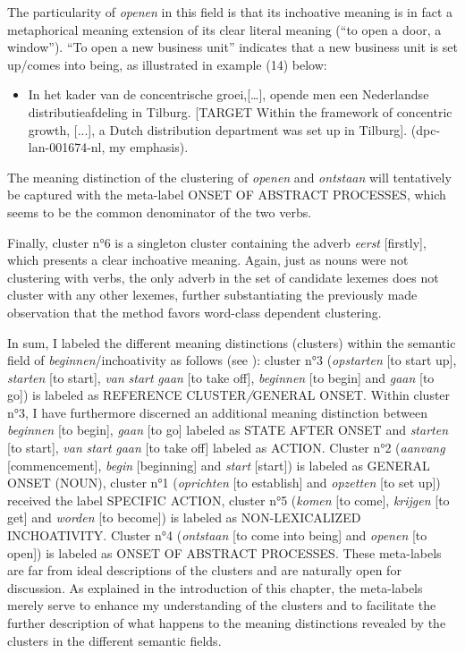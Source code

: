 The particularity of \textit{openen} in this field is that its inchoative meaning is in fact a metaphorical meaning extension of its clear literal meaning (“to open a door, a window”). “To open a new business unit” indicates that a new business unit is set up/comes into being, as illustrated in example (14) below:

\begin{itemize}
\item \begin{styleVoorbeeld}
In het kader van de concentrische groei,[…], opende men een Nederlandse distributieafdeling in Tilburg. [TARGET Within the framework of concentric growth, [...], a Dutch distribution department was set up in Tilburg]. (dpc-lan-001674-nl, my emphasis).
\end{styleVoorbeeld}
\end{itemize}

The meaning distinction of the clustering of \textit{openen} and \textit{ontstaan} will tentatively be captured with the meta-label ONSET OF ABSTRACT PROCESSES, which seems to be the common denominator of the two verbs.

Finally, cluster n°6 is a singleton cluster containing the adverb \textit{eerst} [firstly], which presents a clear inchoative meaning. Again, just as nouns were not clustering with verbs, the only adverb in the set of candidate lexemes does not cluster with any other lexemes, further substantiating the previously made observation that the method favors word-class dependent clustering.

In sum, I labeled the different meaning distinctions (clusters) within the semantic field of \textit{beginnen}/inchoativity as follows (see ): cluster n°3 (\textit{opstarten} [to start up], \textit{starten} [to start], \textit{van} \textit{start} \textit{gaan} [to take off], \textit{beginnen} [to begin] and \textit{gaan} [to go]) is labeled as REFERENCE CLUSTER\textit{/}GENERAL ONSET. Within cluster n°3, I have furthermore discerned an additional meaning distinction between \textit{beginnen} [to begin], \textit{gaan} [to go] labeled as STATE AFTER ONSET and \textit{starten} [to start], \textit{van} \textit{start} \textit{gaan} [to take off] labeled as ACTION. Cluster n°2 (\textit{aanvang} [commencement], \textit{begin} [beginning] and \textit{start} [start]) is labeled as GENERAL ONSET (NOUN), cluster n°1 (\textit{oprichten} [to establish] and \textit{opzetten} [to set up]) received the label {SPECIFIC} ACTION, cluster n°5 (\textit{komen} [to come], \textit{krijgen} [to get] and \textit{worden} [to become]) is labeled as {NON-LEXICALIZED INCHOATIVITY}. Cluster n°4 (\textit{ontstaan} [to come into being] and \textit{openen} [to open]) is labeled as {ONSET OF ABSTRACT PROCESSES}. These meta-labels are far from ideal descriptions of the clusters and are naturally open for discussion. As explained in the introduction of this chapter, the meta-labels merely serve to enhance my understanding of the clusters and to facilitate the further description of what happens to the meaning distinctions revealed by the clusters in the different semantic fields.

